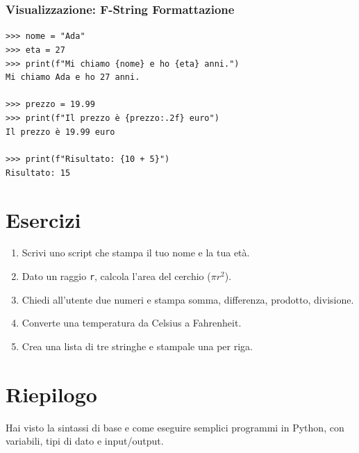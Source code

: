 \subsubsection{Visualizzazione: F-String Formattazione}
\begin{tcolorbox}[title=Terminal Output - F-String Examples]
\texttt{>>> nome = "Ada"}\\
\texttt{>>> eta = 27}\\
\texttt{>>> print(f"Mi chiamo \{nome\} e ho \{eta\} anni.")}\\
\texttt{Mi chiamo Ada e ho 27 anni.}\\
\\
\texttt{>>> prezzo = 19.99}\\
\texttt{>>> print(f"Il prezzo è \{prezzo:.2f\} euro")}\\
\texttt{Il prezzo è 19.99 euro}\\
\\
\texttt{>>> print(f"Risultato: \{10 + 5\}")}\\
\texttt{Risultato: 15}
\end{tcolorbox}

\section{Esercizi}
\begin{enumerate}
	\item Scrivi uno script che stampa il tuo nome e la tua età.
	\item Dato un raggio \texttt{r}, calcola l'area del cerchio (\(\pi r^2\)).
	\item Chiedi all'utente due numeri e stampa somma, differenza, prodotto, divisione.
	\item Converte una temperatura da Celsius a Fahrenheit.
	\item Crea una lista di tre stringhe e stampale una per riga.
\end{enumerate}

\section{Riepilogo}
Hai visto la sintassi di base e come eseguire semplici programmi in Python, con variabili, tipi di dato e input/output.

